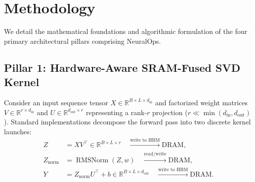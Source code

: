 \section{Methodology}
\label{sec:method}

We detail the mathematical foundations and algorithmic formulation of the four primary architectural pillars comprising NeuralOps.

\subsection{Pillar 1: Hardware-Aware SRAM-Fused SVD Kernel}
\label{sec:fused_kernel}

Consider an input sequence tensor $X \in \mathbb{R}^{B \times L \times d_{\text{in}}}$ and factorized weight matrices $V \in \mathbb{R}^{r \times d_{\text{in}}}$ and $U \in \mathbb{R}^{d_{\text{out}} \times r}$ representing a rank-$r$ projection ($r \ll \min(d_{\text{in}}, d_{\text{out}})$). Standard implementations decompose the forward pass into two discrete kernel launches:
\begin{align}
Z &= X V^\top \in \mathbb{R}^{B \times L \times r} \quad \xrightarrow{\text{write to HBM}} \text{DRAM}, \\
Z_{\text{norm}} &= \operatorname{RMSNorm}(Z, w) \quad \xrightarrow{\text{read/write}} \text{DRAM}, \\
Y &= Z_{\text{norm}} U^\top + b \in \mathbb{R}^{B \times L \times d_{\text{out}}} \quad \xrightarrow{\text{write to HBM}} \text{DRAM}.
\end{align}

